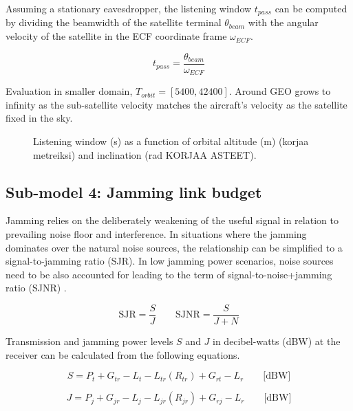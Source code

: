 \documentclass[english, 12pt, a4paper, elec, utf8, a-1b, online]{aaltothesis}
\begin{document}
Assuming a stationary eavesdropper, the listening window ${t_{pass}}$ can be computed by dividing the beamwidth of the satellite terminal $\theta_{beam}$ with the angular velocity of the satellite in the ECF coordinate frame $\omega_{ECF}$.

\begin{equation}
  t_{pass} = \frac{\theta_{beam}}{\omega_{ECF}}
\end{equation}

Evaluation in smaller domain, $T_{orbit} = [5400, 42400]$. Around GEO grows to infinity as the sub-satellite velocity matches the aircraft's velocity as the satellite fixed in the sky.
\begin{figure}[h]
  \centering
  
  \caption{Listening window (s) as a function of orbital altitude (m) (korjaa metreiksi) and inclination (rad KORJAA ASTEET).} %
  \label{fig-listening-window}
\end{figure}

\subsection{Sub-model 4: Jamming link budget} \label{ch-results-submodel-4-link-budget}
Jamming relies on the deliberately weakening of the useful signal in relation to prevailing noise floor and interference. In situations where the jamming dominates over the natural noise sources, the relationship can be simplified to a signal-to-jamming ratio (SJR). In low jamming power scenarios, noise sources need to be also accounted for leading to the term of signal-to-noise+jamming ratio (SJNR) \cite{kosola2013digitaalinen}. %

\begin{equation*}
  \text{SJR} = \frac{S}{J} \qquad
  \text{SJNR} = \frac{S}{J+N}
\end{equation*}

Transmission and jamming power levels $S$ and $J$ in decibel-watts (dBW) at the receiver can be calculated from the following equations.

\begin{equation} \label{eq-signal-power-full}
  S = P_t + G_{tr}-L_t-L_{tr}(R_{tr})+G_{rt}-L_r \qquad \text{[dBW]}
\end{equation}

\begin{equation}
  J = P_j + G_{jr}-L_j-L_{jr}(R_{jr})+G_{rj}-L_r \qquad \text{[dBW]}
\end{equation}
\end{document}
